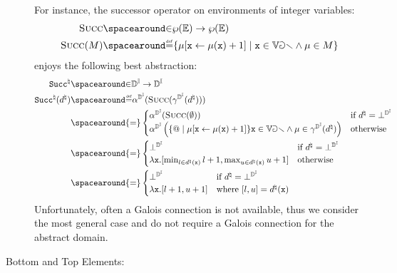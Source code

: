 \begin{description}
  For instance, the successor operator on environments of integer variables:
  \begin{align*}
    \textsc{Succ} &\IN \setof\env \to \setof\env \\
    \textsc{Succ}(\defsetofenvs) &\DefeQ \setdef{\updatemem{\defenv}{\defvariable}{\defenv(\defvariable) + 1}}{\defvariable\in\variables \land \defenv\in\defsetofenvs}
  \end{align*}
  enjoys the following best abstraction:
  \begin{align*}
    \texttt{Succ}^\natural &\IN \intervalabstractdomaintype \to \intervalabstractdomaintype \\
    \texttt{Succ}^\natural(\defabstractvalue) &\DefeQ \intervalabstractdomainabstraction(\textsc{Succ}(\intervalabstractdomainconcretization(\defabstractvalue))) \\
    &\spacearound{=} \begin{cases}
      \intervalabstractdomainabstraction(\textsc{Succ}(\emptyset)) &\text{if $\defabstractvalue = \intervalabstractdomainbottom$} \\
      \intervalabstractdomainabstraction\left(\setdef@{\updatemem{\defenv}{\defvariable}{\defenv(\defvariable) + 1}}{\defvariable\in\variables \land \defenv\in\intervalabstractdomainconcretization(\defabstractvalue)}\right) &\text{otherwise}
    \end{cases} \\
    &\spacearound{=} \begin{cases}
      \intervalabstractdomainbottom & \text{if } \defabstractvalue = \intervalabstractdomainbottom \\
      \lambda \defvariable.\interval{\min_{{l\in\defabstractvalue(\defvariable)}} l + 1}{\max_{u\in\defabstractvalue(\defvariable)} {u + 1}} & \text{otherwise}
    \end{cases} \\
    &\spacearound{=} \begin{cases}
      \intervalabstractdomainbottom & \text{if } \defabstractvalue = \intervalabstractdomainbottom \\
      \lambda \defvariable.\interval{l + 1}{u + 1} & \text{where } \interval{l}{u} = \defabstractvalue(\defvariable)
    \end{cases}
 \end{align*}
  Unfortunately, often a Galois connection is not available, thus we consider the most general case and do not require a Galois connection for the abstract domain.
  \item[Bottom and Top Elements:]

\end{description}

